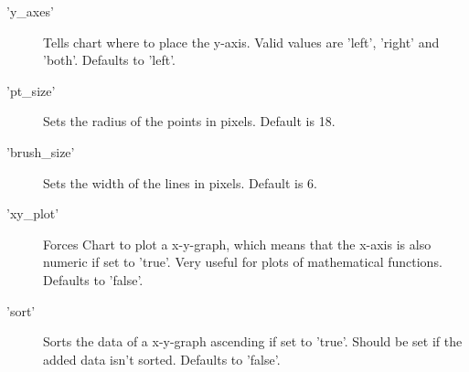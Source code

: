 \begin{description}
\item['y\_axes'] Tells chart where to place the y-axis. Valid values are 'left', 'right' and 'both'. Defaults to 'left'.
\item['pt\_size']Sets the radius of the points in pixels. Default is 18.
\item['brush\_size']Sets the width of the lines in pixels. Default is 6.
\item['xy\_plot']Forces Chart to plot a x-y-graph, which means that the x-axis is also numeric if set to 'true'. Very useful for plots of mathematical functions. Defaults to 'false'.
\item['sort']Sorts the data of a x-y-graph ascending if set to 'true'. Should be set if the added data isn't sorted. Defaults to 'false'.  
\end{description}
